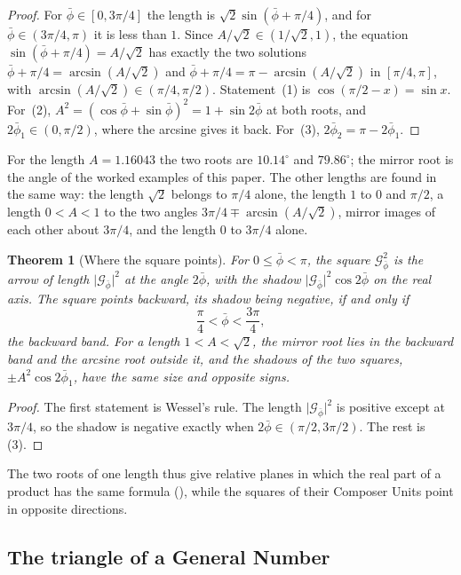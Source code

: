 \documentclass[11pt,a4paper]{amsart}
\theoremstyle{plain}
\newtheorem{theorem}{Theorem}[section]
\theoremstyle{definition}
\theoremstyle{remark}
\newcommand{\pb}{\bar{\phi}}                     %
\newcommand{\Gp}{\mathcal{G}_{\bar{\phi}}}       %
\begin{document}
\begin{proof}
For $\pb \in [0, 3\pi/4]$ the length is $\sqrt{2}\sin(\pb + \pi/4)$, and for $\pb \in (3\pi/4, \pi)$ it is less than $1$. Since $A/\sqrt{2} \in (1/\sqrt{2}, 1)$, the equation $\sin(\pb + \pi/4) = A/\sqrt{2}$ has exactly the two solutions $\pb + \pi/4 = \arcsin(A/\sqrt{2})$ and $\pb + \pi/4 = \pi - \arcsin(A/\sqrt{2})$ in $[\pi/4, \pi]$, with $\arcsin(A/\sqrt{2}) \in (\pi/4, \pi/2)$. Statement~(1) is $\cos(\pi/2 - x) = \sin x$. For~(2), $A^2 = (\cos\pb + \sin\pb)^2 = 1 + \sin 2\pb$ at both roots, and $2\pb_1 \in (0, \pi/2)$, where the arcsine gives it back. For~(3), $2\pb_2 = \pi - 2\pb_1$.
\end{proof}

For the length $A = 1.16043$ the two roots are $10.14^\circ$ and $79.86^\circ$; the mirror root is the angle of the worked examples of this paper. The other lengths are found in the same way: the length $\sqrt{2}$ belongs to $\pi/4$ alone, the length $1$ to $0$ and $\pi/2$, a length $0 < A < 1$ to the two angles $3\pi/4 \mp \arcsin(A/\sqrt{2})$, mirror images of each other about $3\pi/4$, and the length $0$ to $3\pi/4$ alone.

\begin{theorem}[Where the square points]\label{thm:square-band}
For $0 \le \pb < \pi$, the square $\Gp^2$ is the arrow of length $\lvert\Gp\rvert^2$ at the angle $2\pb$, with the shadow $\lvert\Gp\rvert^2\cos 2\pb$ on the real axis. The square points backward, its shadow being negative, if and only if
\[
\frac{\pi}{4} < \pb < \frac{3\pi}{4} ,
\]
the \emph{backward band}. For a length $1 < A < \sqrt{2}$, the mirror root lies in the backward band and the arcsine root outside it, and the shadows of the two squares, $\pm A^2\cos 2\pb_1$, have the same size and opposite signs.
\end{theorem}

\begin{proof}
The first statement is Wessel's rule. The length $\lvert\Gp\rvert^2$ is positive except at $3\pi/4$, so the shadow is negative exactly when $2\pb \in (\pi/2, 3\pi/2)$. The rest is (3).
\end{proof}

The two roots of one length thus give relative planes in which the real part of a product has the same formula (), while the squares of their Composer Units point in opposite directions.

\subsection{The triangle of a General Number}\label{subsec:triangle}
\end{document}
